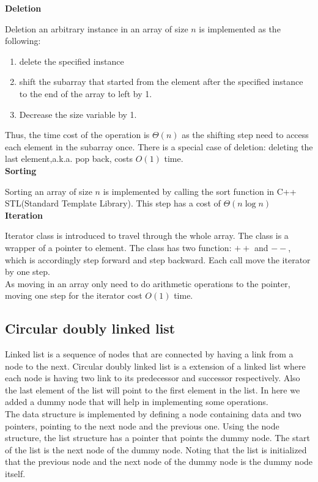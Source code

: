 \documentclass{article}
\begin{document}
   	 \pagebreak 
	\noindent
	\textbf{Deletion} 
	
   	 Deletion an arbitrary instance in an array of size $n$ is implemented as the following:   	
   	\begin{enumerate}
   		\item delete the specified instance
   		\item shift the subarray that started from the element after the specified instance to the end of the array to left by 1. 
   		\item Decrease the size variable by 1.
	\end{enumerate}
	Thus, the time cost of the operation is $\Theta(n)$ as the shifting step need to access each element in the subarray once.  
	There is a special case of deletion: deleting the last element,a.k.a. pop back, costs $O(1)$ time. \\
	
	\noindent
	\textbf{Sorting}
	
	Sorting an array of size $n$ is implemented by calling the sort function in C++ STL(Standard Template Library). This step has a cost of $\Theta(n \log n)$\\

	\noindent
	\textbf{Iteration}	

	Iterator class is introduced to travel through the whole array. The class is a wrapper of a pointer to element. The class has two function: $++$ and $--$, which is accordingly step forward and step backward. Each call move the iterator by one step. \\
\indent	As moving in an array only need to do arithmetic operations to the pointer, moving one step for the iterator cost $O(1)$ time.
	
	\subsection{Circular doubly linked list}
	Linked list is a sequence of nodes that are connected by having a link from a node to the next. Circular doubly linked list is a extension of a linked list where each node is having two link to its predecessor and successor respectively. Also the last element of the list will point to the first element in the list. In here we added a dummy node that will help in implementing some operations.\\
	
	The data structure is implemented by defining a node containing data and two pointers, pointing to the next node and the previous one. 
	Using the node structure, the list structure has a pointer that points the dummy node. The start of the list is the next node of the dummy node. Noting that the list is initialized that the previous node and the next node of the dummy node is the dummy node itself.
\end{document}

